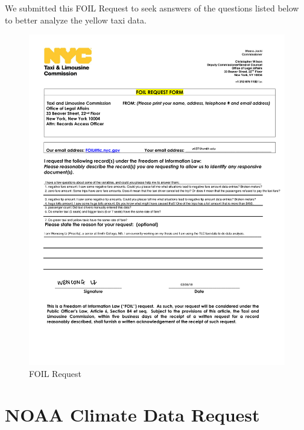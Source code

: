\documentclass[12pt,twoside]{reedthesis}
\theoremstyle{definition}
\theoremstyle{definition}
\theoremstyle{definition}
\theoremstyle{remark}
\begin{document}
We submitted this FOIL Request to seek asnswers of the questions listed
below to better analyze the yellow taxi data.
\begin{figure}
  \centering
  \includegraphics[width=4.5in]{figure/appendix_foil_form_doc.pdf}
  \caption{FOIL Request}
\end{figure}
\chapter{NOAA Climate Data Request}\label{noaa-climate-data-request}
\end{document}
